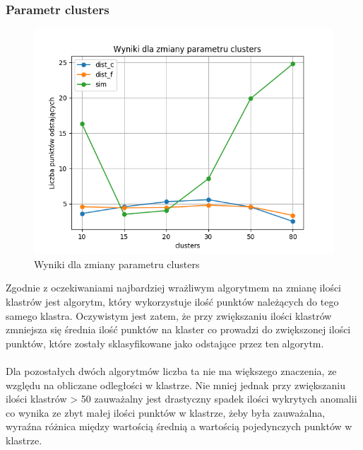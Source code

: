 \documentclass[eng,printmode]{mgr}
\begin{document}
\subsubsection{Parametr clusters}
\begin{figure}[H]
  \begin{center}
  \includegraphics[scale=0.7]{avg_clusters}
  \end{center}
  \caption{Wyniki dla zmiany parametru clusters}
  \label{fig:avg_clusters}
\end{figure}
Zgodnie z oczekiwaniami najbardziej wrażliwym algorytmem na zmianę ilości klastrów jest algorytm, który wykorzystuje ilość punktów należących do tego samego klastra. Oczywistym jest zatem, że przy zwiększaniu ilości klastrów zmniejsza się średnia ilość punktów na klaster co prowadzi do zwiększonej ilości punktów, które zostały sklasyfikowane jako odstające przez ten algorytm.
\\\\
Dla pozostałych dwóch algorytmów liczba ta nie ma większego znaczenia, ze względu na obliczane odległości w klastrze. Nie mniej jednak przy zwiększaniu ilości klastrów > 50 zauważalny jest drastyczny spadek ilości wykrytych anomalii co wynika ze zbyt małej ilości punktów w klastrze, żeby była zauważalna, wyraźna różnica między wartością średnią a wartością pojedynczych punktów w klastrze.
\end{document}
